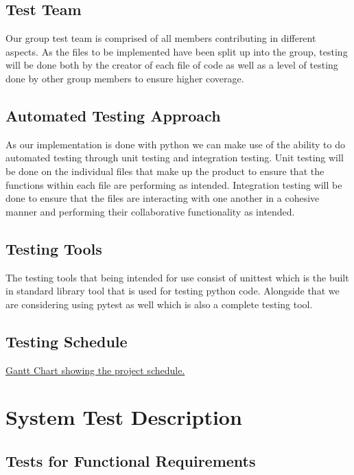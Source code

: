 \documentclass[12pt, titlepage]{article}
\begin{document}
\subsection{Test Team}

Our group test team is comprised of all members contributing in different aspects. As the files to be implemented have been split up into the group, testing will be done both by the creator of each file of code as well as a level of testing done by other group members to ensure higher coverage. 

\subsection{Automated Testing Approach}

As our implementation is done with python we can make use of the ability to do automated testing through unit testing and integration testing. Unit testing will be done on the individual files that make up the product to ensure that the functions within each file are performing as intended. Integration testing will be done to ensure that the files are interacting with one another in a cohesive manner and performing their collaborative functionality as intended. 

\subsection{Testing Tools}

The testing tools that being intended for use consist of unittest which is the built in standard library tool that is used for testing python code. Alongside that we are considering using pytest as well which is also a complete testing tool. 

\subsection{Testing Schedule}

   \href{3XA3 Gantt Chart.pdf}{Gantt Chart showing the project schedule.}

\section{System Test Description}
	
\subsection{Tests for Functional Requirements}
\end{document}
